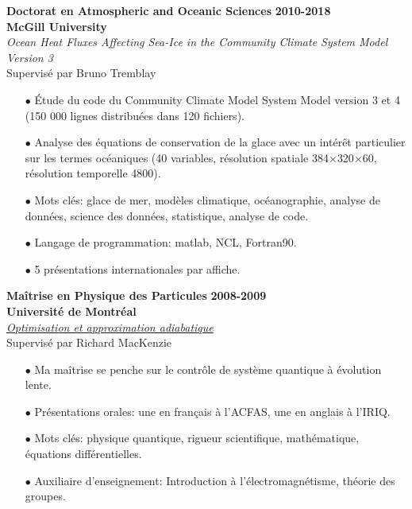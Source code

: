 \documentclass[paper=letter,fontsize=11pt]{scrartcl} %
\begin{document}
\noindent \textbf{Doctorat en Atmospheric and Oceanic Sciences} \hfill \textbf{2010-2018}\\
\textbf{McGill University}\\
\hspace*{0.5cm} \emph{Ocean Heat Fluxes Affecting Sea-Ice in the Community Climate System Model Version 3}\\
\hspace*{0.5cm} Supervisé par Bruno Tremblay
\begin{itemize}
\item[$\bullet$] Étude du code du Community Climate Model System Model version 3 et 4 (150 000 lignes distribuées dans 120 fichiers).
\item[$\bullet$] Analyse des équations de conservation de la glace avec un intérêt particulier sur les termes océaniques (40 variables, résolution spatiale 384$\times$320$\times$60, résolution temporelle 4800).
\item[$\bullet$] Mots clés: glace de mer, modèles climatique, océanographie, analyse de données, science des données, statistique, analyse de code. 
\item[$\bullet$] Langage de programmation: matlab, NCL, Fortran90.
\item[$\bullet$] 5 présentations internationales par affiche. 
\end{itemize}

\vspace{0.5\baselineskip}

\noindent \textbf{Maîtrise en Physique des Particules} \hfill \textbf{2008-2009}\\
\textbf{Université de Montréal}\\
\hspace*{0.5cm} \href{https://papyrus.bib.umontreal.ca/xmlui/handle/1866/4954}{\emph{Optimisation et approximation adiabatique}}\\
\hspace*{0.5cm} Supervisé par Richard MacKenzie
\begin{itemize}
\item[$\bullet$] Ma maîtrise se penche sur le contrôle de système quantique à évolution lente. 
\item[$\bullet$] Présentations orales: une en français à l'ACFAS, une en anglais à l'IRIQ.
\item[$\bullet$] Mots clés: physique quantique, rigueur scientifique, mathématique, équations différentielles.
\item[$\bullet$] Auxiliaire d'enseignement: Introduction à l'électromagnétisme, théorie des groupes.
\end{itemize}
\end{document}
